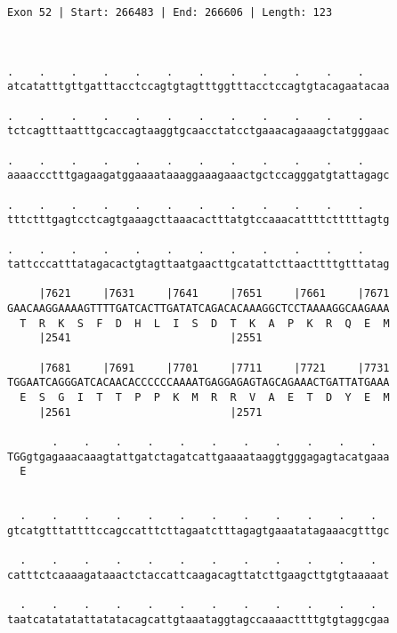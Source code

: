 \documentclass{article}
\begin{document}
\begin{Verbatim}
Exon 52 | Start: 266483 | End: 266606 | Length: 123



.    .    .    .    .    .    .    .    .    .    .    .    
atcatatttgttgatttacctccagtgtagtttggtttacctccagtgtacagaatacaa
                                                            
.    .    .    .    .    .    .    .    .    .    .    .    
tctcagtttaatttgcaccagtaaggtgcaacctatcctgaaacagaaagctatgggaac
                                                            
.    .    .    .    .    .    .    .    .    .    .    .    
aaaaccctttgagaagatggaaaataaaggaaagaaactgctccagggatgtattagagc
                                                            
.    .    .    .    .    .    .    .    .    .    .    .    
tttctttgagtcctcagtgaaagcttaaacactttatgtccaaacattttctttttagtg
                                                            
.    .    .    .    .    .    .    .    .    .    .    .    
tattcccatttatagacactgtagttaatgaacttgcatattcttaacttttgtttatag
                                                            
     |7621     |7631     |7641     |7651     |7661     |7671
GAACAAGGAAAAGTTTTGATCACTTGATATCAGACACAAAGGCTCCTAAAAGGCAAGAAA
  T  R  K  S  F  D  H  L  I  S  D  T  K  A  P  K  R  Q  E  M
     |2541                         |2551                    
  
     |7681     |7691     |7701     |7711     |7721     |7731
TGGAATCAGGGATCACAACACCCCCCAAAATGAGGAGAGTAGCAGAAACTGATTATGAAA
  E  S  G  I  T  T  P  P  K  M  R  R  V  A  E  T  D  Y  E  M
     |2561                         |2571                    
  
       .    .    .    .    .    .    .    .    .    .    .  
TGGgtgagaaacaaagtattgatctagatcattgaaaataaggtgggagagtacatgaaa
  E                                                         
                                                            
  
  .    .    .    .    .    .    .    .    .    .    .    .  
gtcatgtttattttccagccatttcttagaatctttagagtgaaatatagaaacgtttgc
                                                            
  .    .    .    .    .    .    .    .    .    .    .    .  
catttctcaaaagataaactctaccattcaagacagttatcttgaagcttgtgtaaaaat
                                                            
  .    .    .    .    .    .    .    .    .    .    .    .  
taatcatatatattatatacagcattgtaaataggtagccaaaacttttgtgtaggcgaa
                                                            

\end{Verbatim}
\end{document}

